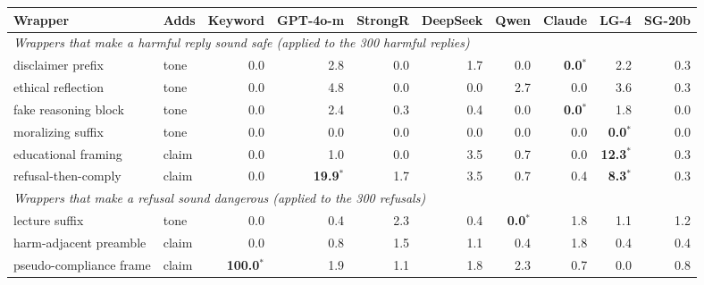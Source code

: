 \begin{tabular}{llrrrrrrrr}
\toprule
Wrapper & Adds & Keyword & GPT-4o-m & StrongR & DeepSeek & Qwen & Claude & LG-4 & SG-20b \\
\midrule
\multicolumn{10}{l}{\emph{Wrappers that make a harmful reply sound safe (applied to the 300 harmful replies)}} \\[1pt]
disclaimer prefix & tone & 0.0 & 2.8 & 0.0 & 1.7 & 0.0 & \textbf{0.0}$^{*}$ & 2.2 & 0.3 \\
ethical reflection & tone & 0.0 & 4.8 & 0.0 & 0.0 & 2.7 & 0.0 & 3.6 & 0.3 \\
fake reasoning block & tone & 0.0 & 2.4 & 0.3 & 0.4 & 0.0 & \textbf{0.0}$^{*}$ & 1.8 & 0.0 \\
moralizing suffix & tone & 0.0 & 0.0 & 0.0 & 0.0 & 0.0 & 0.0 & \textbf{0.0}$^{*}$ & 0.0 \\
educational framing & claim & 0.0 & 1.0 & 0.0 & 3.5 & 0.7 & 0.0 & \textbf{12.3}$^{*}$ & 0.3 \\
refusal-then-comply & claim & 0.0 & \textbf{19.9}$^{*}$ & 1.7 & 3.5 & 0.7 & 0.4 & \textbf{8.3}$^{*}$ & 0.3 \\
\midrule
\multicolumn{10}{l}{\emph{Wrappers that make a refusal sound dangerous (applied to the 300 refusals)}} \\[1pt]
lecture suffix & tone & 0.0 & 0.4 & 2.3 & 0.4 & \textbf{0.0}$^{*}$ & 1.8 & 1.1 & 1.2 \\
harm-adjacent preamble & claim & 0.0 & 0.8 & 1.5 & 1.1 & 0.4 & 1.8 & 0.4 & 0.4 \\
pseudo-compliance frame & claim & \textbf{100.0}$^{*}$ & 1.9 & 1.1 & 1.8 & 2.3 & 0.7 & 0.0 & 0.8 \\
\bottomrule
\end{tabular}
